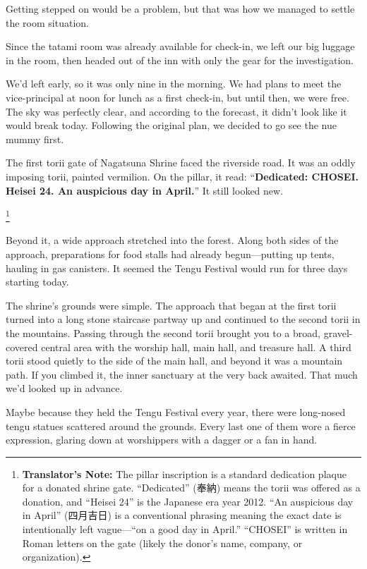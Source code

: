 \documentclass[
    a4paper,
    12pt,
    twoside,
    openany,
    UTF8,
    fontset=windows
]{ctexbook}
\begin{document}
Getting stepped on would be a problem, but that was how we managed to settle the room situation.

Since the tatami room was already available for check-in, we left our big luggage in the room, then headed out of the inn with only the gear for the investigation.

We'd left early, so it was only nine in the morning. We had plans to meet the vice-principal at noon for lunch as a first check-in, but until then, we were free. The sky was perfectly clear, and according to the forecast, it didn't look like it would break today. Following the original plan, we decided to go see the nue mummy first.

The first torii gate of Nagatsuna Shrine faced the riverside road. It was an oddly imposing torii, painted vermilion. On the pillar, it read: ``\textbf{Dedicated: CHOSEI. Heisei 24. An auspicious day in April.}'' It still looked new.

\footnote{\textbf{Translator's Note:} The pillar inscription is a standard dedication plaque for a donated shrine gate. ``Dedicated'' (奉納) means the torii was offered as a donation, and ``Heisei 24'' is the Japanese era year 2012. ``An auspicious day in April'' (四月吉日) is a conventional phrasing meaning the exact date is intentionally left vague---``on a good day in April.'' ``CHOSEI'' is written in Roman letters on the gate (likely the donor's name, company, or organization).}

Beyond it, a wide approach stretched into the forest. Along both sides of the approach, preparations for food stalls had already begun---putting up tents, hauling in gas canisters. It seemed the Tengu Festival would run for three days starting today.

The shrine's grounds were simple. The approach that began at the first torii turned into a long stone staircase partway up and continued to the second torii in the mountains. Passing through the second torii brought you to a broad, gravel-covered central area with the worship hall, main hall, and treasure hall. A third torii stood quietly to the side of the main hall, and beyond it was a mountain path. If you climbed it, the inner sanctuary at the very back awaited. That much we'd looked up in advance.

Maybe because they held the Tengu Festival every year, there were long-nosed tengu statues scattered around the grounds. Every last one of them wore a fierce expression, glaring down at worshippers with a dagger or a fan in hand.
\end{document}
